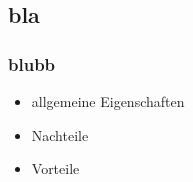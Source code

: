 \documentclass[a4paper, 12pt]{article}
\begin{document}
\subsection{bla}

\subsubsection*{blubb}

\begin{itemize}
  \item allgemeine Eigenschaften
\end{itemize}
\begin{itemize}
  \renewcommand{\labelitemi}{\(-\)}%
  \item Nachteile
\end{itemize}
\begin{itemize}
  \renewcommand{\labelitemi}{+}%
  \item Vorteile
\end{itemize}
\end{document}

